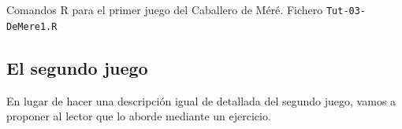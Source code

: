 \documentclass[10pt,a4paper]{article}\usepackage[]{graphicx}\usepackage[]{color}
\begin{document}
                                                                                                                                                            
                                                                                                                                                            \begin{table}[h!]
                                                                                                                                                            
                                                                                                                                                            \caption{Comandos R para el primer juego del Caballero de Méré. Fichero {\tt Tut-03-DeMere1.R}}
                                                                                                                                                            \label{tut03:tabla:FicheroTut-03-DeMere1}
                                                                                                                                                            \end{table}
                                                                                                                                                            
                                                                                                                                                            \subsection{El segundo juego}
                                                                                                                                                            \label{tut03:subsec:SegundoJuego}
                                                                                                                                                            
                                                                                                                                                            En lugar de hacer una descripción igual de detallada del segundo juego, vamos a proponer al lector que lo aborde mediante un ejercicio.
                                                                                                                                                            
\end{document}
